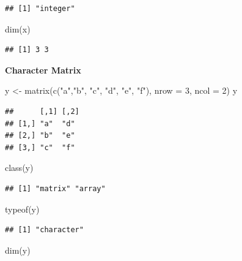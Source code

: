 \documentclass[
]{article}
\newenvironment{Shaded}{\begin{snugshade}}{\end{snugshade}}
\newcommand{\AttributeTok}[1]{\textcolor[rgb]{0.77,0.63,0.00}{#1}}
\newcommand{\DecValTok}[1]{\textcolor[rgb]{0.00,0.00,0.81}{#1}}
\newcommand{\FunctionTok}[1]{\textcolor[rgb]{0.00,0.00,0.00}{#1}}
\newcommand{\NormalTok}[1]{#1}
\newcommand{\OtherTok}[1]{\textcolor[rgb]{0.56,0.35,0.01}{#1}}
\newcommand{\StringTok}[1]{\textcolor[rgb]{0.31,0.60,0.02}{#1}}
\begin{document}
\begin{verbatim}
## [1] "integer"
\end{verbatim}

\begin{Shaded}
\begin{Highlighting}[]
\FunctionTok{dim}\NormalTok{(x)}
\end{Highlighting}
\end{Shaded}

\begin{verbatim}
## [1] 3 3
\end{verbatim}

\textbf{Character Matrix}

\begin{Shaded}
\begin{Highlighting}[]
\NormalTok{y }\OtherTok{\textless{}{-}} \FunctionTok{matrix}\NormalTok{(}\FunctionTok{c}\NormalTok{(}\StringTok{"a"}\NormalTok{,}\StringTok{"b"}\NormalTok{, }\StringTok{"c"}\NormalTok{, }\StringTok{"d"}\NormalTok{, }\StringTok{"e"}\NormalTok{, }\StringTok{"f"}\NormalTok{), }\AttributeTok{nrow =} \DecValTok{3}\NormalTok{, }\AttributeTok{ncol =} \DecValTok{2}\NormalTok{)}
\NormalTok{y}
\end{Highlighting}
\end{Shaded}

\begin{verbatim}
##      [,1] [,2]
## [1,] "a"  "d" 
## [2,] "b"  "e" 
## [3,] "c"  "f"
\end{verbatim}

\begin{Shaded}
\begin{Highlighting}[]
\FunctionTok{class}\NormalTok{(y)}
\end{Highlighting}
\end{Shaded}

\begin{verbatim}
## [1] "matrix" "array"
\end{verbatim}

\begin{Shaded}
\begin{Highlighting}[]
\FunctionTok{typeof}\NormalTok{(y)}
\end{Highlighting}
\end{Shaded}

\begin{verbatim}
## [1] "character"
\end{verbatim}

\begin{Shaded}
\begin{Highlighting}[]
\FunctionTok{dim}\NormalTok{(y)}
\end{Highlighting}
\end{Shaded}
\end{document}
